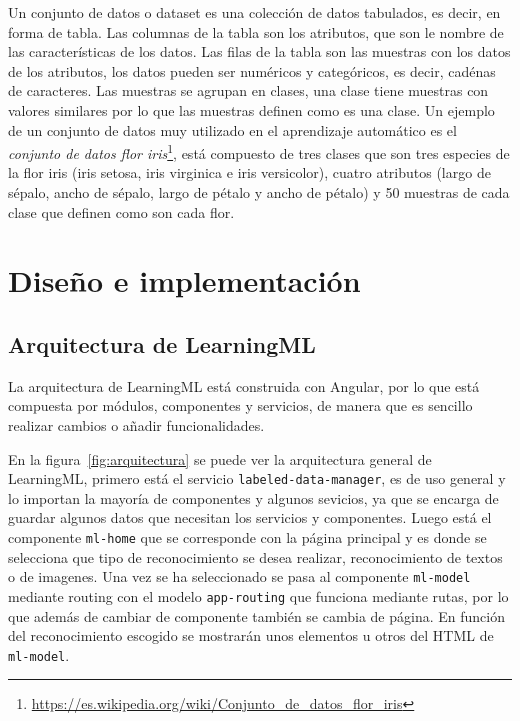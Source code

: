 \documentclass[a4paper, 12pt]{book}
\begin{document}
Un conjunto de datos o dataset es una colección de datos tabulados, es decir, en forma de tabla. 
Las columnas de la tabla son los atributos, que son le nombre de las características de los datos. 
Las filas de la tabla son las muestras con los datos de los atributos, los datos pueden ser numéricos y categóricos, es decir, cadénas de caracteres. 
Las muestras se agrupan en clases, una clase tiene muestras con valores similares por lo que las muestras definen como es una clase. 
Un ejemplo de un conjunto de datos muy utilizado en el aprendizaje automático es el \emph{conjunto de datos flor iris}\footnote{\url{https://es.wikipedia.org/wiki/Conjunto_de_datos_flor_iris}}, está compuesto de tres clases que son tres especies de la flor iris (iris setosa, iris virginica e iris versicolor), cuatro atributos (largo de sépalo, ancho de sépalo, largo de pétalo y ancho de pétalo) y 50 muestras de cada clase que definen como son cada flor.


\cleardoublepage
\chapter{Diseño e implementación} 

\section{Arquitectura de LearningML} 
\label{sec:arquitectura}

La arquitectura de LearningML está construida con Angular, por lo que está compuesta por módulos, componentes y servicios, de manera que es sencillo realizar cambios o añadir funcionalidades. 

En la figura~\ref{fig:arquitectura} se puede ver la arquitectura general de LearningML, primero está el servicio \texttt{labeled-data-manager}, es de uso general y lo importan la mayoría de componentes y algunos sevicios, ya que se encarga de guardar  algunos datos que necesitan los servicios y componentes. 
Luego está el componente \texttt{ml-home} que se corresponde con la página principal y es donde se selecciona que tipo de reconocimiento se desea realizar, reconocimiento de textos o de imagenes. Una vez se ha seleccionado se pasa al componente \texttt{ml-model} mediante routing con el modelo \texttt{app-routing} que funciona mediante rutas, por lo que además de cambiar de componente también se cambia de página. 
En función del reconocimiento escogido se mostrarán unos elementos u otros del HTML de \texttt{ml-model}.
\end{document}
